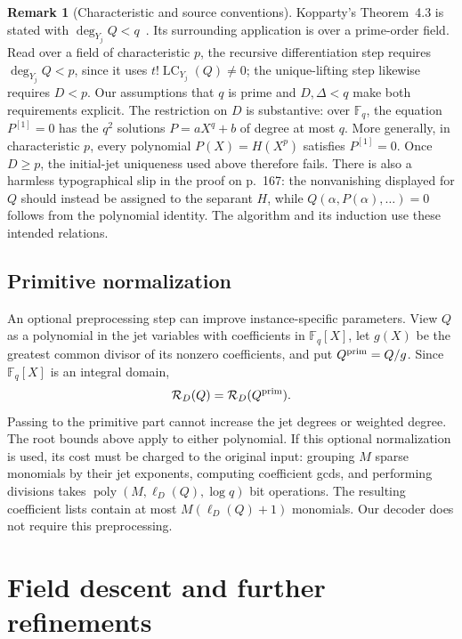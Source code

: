 \documentclass[11pt,letterpaper]{article}
\theoremstyle{definition}
\newtheorem{remark}[remark]{Remark}
\newcommand{\F}{\mathbb{F}}
\newcommand{\poly}{\operatorname{poly}}
\begin{document}
\begin{remark}[Characteristic and source conventions]
\label{rem:kopparty-source-conventions}
Kopparty's Theorem~4.3 is stated with
\(\deg_{Y_j}Q<q\)~\cite{Kopparty15}.  Its surrounding application is over a
prime-order field.  Read over a field of characteristic \(p\), the recursive
differentiation step requires \(\deg_{Y_j}Q<p\), since it uses
\(t!\operatorname{LC}_{Y_j}(Q)\ne0\); the unique-lifting step likewise
requires \(D<p\).  Our assumptions that \(q\) is prime and
\(D,\Delta<q\) make both requirements explicit.  The restriction on \(D\)
is substantive: over \(\F_q\), the equation \(P^{[1]}=0\) has the
\(q^2\) solutions \(P=aX^q+b\) of degree at most \(q\).  More generally,
in characteristic \(p\), every polynomial \(P(X)=H(X^p)\) satisfies
\(P^{[1]}=0\).  Once \(D\ge p\), the initial-jet uniqueness used above
therefore fails.  There is also a
harmless typographical slip in the proof on p.~167: the nonvanishing
displayed for \(Q\) should instead be assigned to the separant \(H\), while
\(Q(\alpha,P(\alpha),\ldots)=0\) follows from the polynomial identity.
The algorithm and its induction use these intended relations.
\end{remark}
 \subsection{Primitive normalization}
\label{sec:primitive-normalization}

An optional preprocessing step can improve instance-specific parameters.
View \(Q\) as a polynomial in the jet variables with
coefficients in \(\F_q[X]\), let \(g(X)\) be the greatest common divisor of
its nonzero coefficients, and put \(Q^{\rm prim}=Q/g\). Since
\(\F_q[X]\) is an integral domain,
\begin{equation}
  \mathcal R_D(Q)=\mathcal R_D(Q^{\rm prim}).
  \label{eq:primitive-part-same-roots}
\end{equation}
Passing to the primitive part cannot increase the jet degrees or weighted
degree. The root bounds above apply to either polynomial.
If this optional normalization is used, its cost must be charged to the
original input: grouping $M$ sparse monomials by their jet exponents,
computing coefficient gcds, and performing divisions takes
$\poly(M,\ell_D(Q),\log q)$ bit operations. The resulting coefficient
lists contain at most $M(\ell_D(Q)+1)$ monomials.
Our decoder does not require this preprocessing.
 \section{Field descent and further refinements}
\label{sec:refinements}
\end{document}
